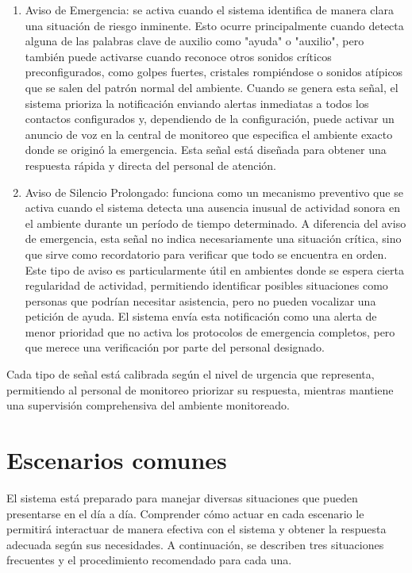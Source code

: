 \begin{enumerate}
  \item Aviso de Emergencia: se activa cuando el sistema identifica de manera clara una situación de riesgo inminente. Esto ocurre principalmente cuando detecta alguna de las palabras clave de auxilio como "ayuda" o "auxilio", pero también puede activarse cuando reconoce otros sonidos críticos preconfigurados, como golpes fuertes, cristales rompiéndose o sonidos atípicos que se salen del patrón normal del ambiente. Cuando se genera esta señal, el sistema prioriza la notificación enviando alertas inmediatas a todos los contactos configurados y, dependiendo de la configuración, puede activar un anuncio de voz en la central de monitoreo que especifica el ambiente exacto donde se originó la emergencia. Esta señal está diseñada para obtener una respuesta rápida y directa del personal de atención.
  \item Aviso de Silencio Prolongado: funciona como un mecanismo preventivo que se activa cuando el sistema detecta una ausencia inusual de actividad sonora en el ambiente durante un período de tiempo determinado. A diferencia del aviso de emergencia, esta señal no indica necesariamente una situación crítica, sino que sirve como recordatorio para verificar que todo se encuentra en orden. Este tipo de aviso es particularmente útil en ambientes donde se espera cierta regularidad de actividad, permitiendo identificar posibles situaciones como personas que podrían necesitar asistencia, pero no pueden vocalizar una petición de ayuda. El sistema envía esta notificación como una alerta de menor prioridad que no activa los protocolos de emergencia completos, pero que merece una verificación por parte del personal designado.
\end{enumerate}

Cada tipo de señal está calibrada según el nivel de urgencia que representa, permitiendo al personal de monitoreo priorizar su respuesta, mientras mantiene una supervisión comprehensiva del ambiente monitoreado.

\section*{Escenarios comunes}

El sistema está preparado para manejar diversas situaciones que pueden presentarse en el día a día. Comprender cómo actuar en cada escenario le permitirá interactuar de manera efectiva con el sistema y obtener la respuesta adecuada según sus necesidades. A continuación, se describen tres situaciones frecuentes y el procedimiento recomendado para cada una.

